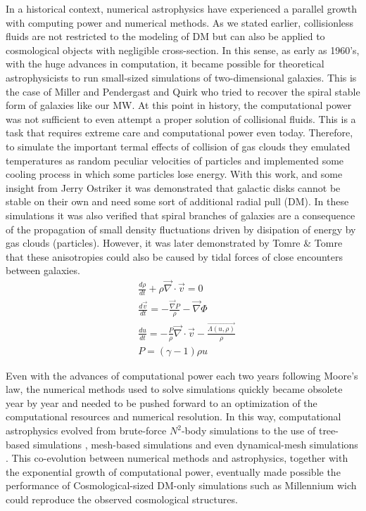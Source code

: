 In a historical context, numerical astrophysics have experienced a parallel growth with computing power and numerical methods. As we stated earlier, collisionless fluids are not restricted to the modeling of DM but can also be applied to cosmological objects with negligible cross-section. In this sense, as early as 1960's, with the huge advances in computation, it became possible for theoretical astrophysicists to run small-sized simulations of two-dimensional galaxies. This is the case of Miller and Pendergast \cite{Miller and Pendergast} and Quirk \cite{MPQ} who tried to recover the spiral stable form of galaxies like our MW. At this point in history, the computational power was not sufficient to even attempt a proper solution of collisional fluids. This is a task that requires extreme care and computational power even today. Therefore, to simulate the important termal effects of collision of gas clouds they emulated temperatures as random peculiar velocities of particles and implemented some cooling process in which some particles lose energy. With this work, and some insight from Jerry Ostriker \cite{JO} it was demonstrated that galactic disks cannot be stable on their own and need some sort of additional radial pull (DM). In these simulations it was also verified that spiral branches of galaxies are a consequence of the propagation of small density fluctuations driven by disipation of energy by gas clouds (particles). However, it was later demonstrated by Tomre \& Tomre \cite{Tomre y Tomre} that these anisotropies could also be caused by tidal forces of close encounters between galaxies.\\

\begin{align}
&\frac{d\rho}{dt} + \rho \vec{\nabla}\cdot\vec{v} = 0\\
&\frac{d\vec{v}}{dt} = -\frac{\vec{\nabla}P}{\rho} - \vec{\nabla} \Phi \\
&\frac{du}{dt} = -\frac{P}{\rho}\vec{\nabla}\cdot\vec{v} - \frac{\vec{\Lambda(u,\rho)}}{\rho}\\
& P = (\gamma -1 )\rho u
\label{eq:euler}
\end{align}


Even with the advances of computational power each two years following Moore's law, the numerical methods used to solve simulations quickly became obsolete year by year and needed to be pushed forward to an optimization of the computational resources and numerical resolution. In this way, computational astrophysics evolved from brute-force $N^2$-body simulations to the use of tree-based simulations \cite{}, mesh-based simulations \cite{} and even dynamical-mesh simulations \cite{}. This co-evolution between numerical methods and astrophysics, together with the exponential growth of computational power, eventually made possible the performance of Cosmological-sized DM-only simulations such as Millennium wich could reproduce the observed cosmological structures. \\ 


